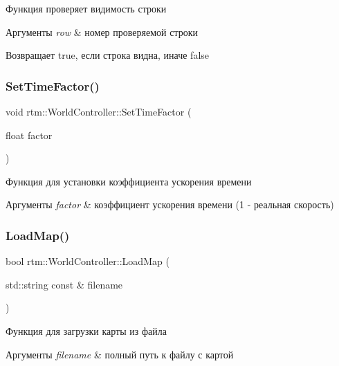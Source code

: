 Функция проверяет видимость строки 
\begin{DoxyParams}{Аргументы}
{\em row} & номер проверяемой строки \\
\hline
\end{DoxyParams}
\begin{DoxyReturn}{Возвращает}
true, если строка видна, иначе false 
\end{DoxyReturn}
\mbox{\label{classrtm_1_1_world_controller_ae06b54bf542fcd9a30945b6d51048f53}} 
\subsubsection{\texorpdfstring{Set\+Time\+Factor()}{SetTimeFactor()}}
{\footnotesize\ttfamily void rtm\+::\+World\+Controller\+::\+Set\+Time\+Factor (\begin{DoxyParamCaption}\item[{float}]{factor }\end{DoxyParamCaption})}

Функция для установки коэффициента ускорения времени 
\begin{DoxyParams}{Аргументы}
{\em factor} & коэффициент ускорения времени (1 -\/ реальная скорость) \\
\hline
\end{DoxyParams}
\mbox{\label{classrtm_1_1_world_controller_a66ec47d83ef2aa4bc88ef8dd91072491}} 
\subsubsection{\texorpdfstring{Load\+Map()}{LoadMap()}\hspace{0.1cm}{\footnotesize\ttfamily [1/2]}}
{\footnotesize\ttfamily bool rtm\+::\+World\+Controller\+::\+Load\+Map (\begin{DoxyParamCaption}\item[{std\+::string const \&}]{filename }\end{DoxyParamCaption})}

Функция для загрузки карты из файла 
\begin{DoxyParams}{Аргументы}
{\em filename} & полный путь к файлу с картой \\
\hline
\end{DoxyParams}
\mbox{\label{classrtm_1_1_world_controller_ada6f03eb6808d52ed7fc6af239851ff3}} 
